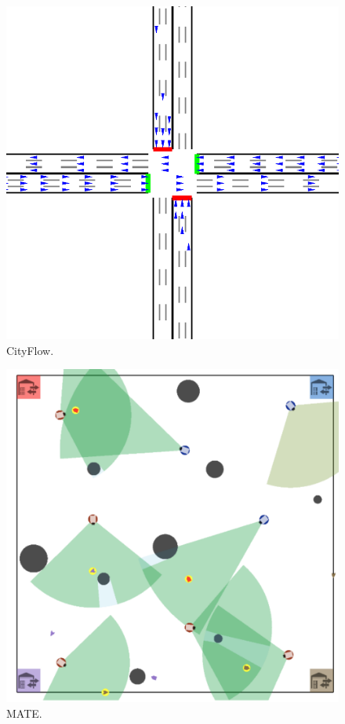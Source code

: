 \begin{subfigure}[b]{0.33\textwidth}
        \centering
        \includegraphics[width=.95\textwidth]{tex_thesis/figures/ch3/cityflow.png}
        \caption{CityFlow.}
\end{subfigure}%
\begin{subfigure}[b]{0.33\textwidth}
        \centering
        \includegraphics[width=.95\textwidth]{tex_thesis/figures/ch3/MATE.png}
        \caption{MATE.}
\end{subfigure}
